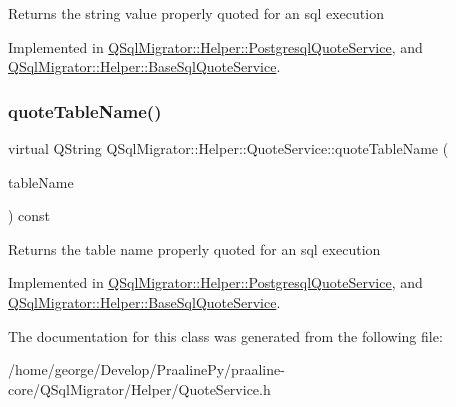 \begin{DoxyReturn}{Returns}
the string value properly quoted for an sql execution 
\end{DoxyReturn}


Implemented in \hyperlink{class_q_sql_migrator_1_1_helper_1_1_postgresql_quote_service_aea4456a2d9ae05fbc1bb653dfcb6571f}{Q\+Sql\+Migrator\+::\+Helper\+::\+Postgresql\+Quote\+Service}, and \hyperlink{class_q_sql_migrator_1_1_helper_1_1_base_sql_quote_service_a54146919b3027be887151bcc27c56dad}{Q\+Sql\+Migrator\+::\+Helper\+::\+Base\+Sql\+Quote\+Service}.

\mbox{\label{class_q_sql_migrator_1_1_helper_1_1_quote_service_acb56728a4d07a8857955e34536844ec7}} 
\subsubsection{\texorpdfstring{quote\+Table\+Name()}{quoteTableName()}}
{\footnotesize\ttfamily virtual Q\+String Q\+Sql\+Migrator\+::\+Helper\+::\+Quote\+Service\+::quote\+Table\+Name (\begin{DoxyParamCaption}\item[{const Q\+String \&}]{table\+Name }\end{DoxyParamCaption}) const\hspace{0.3cm}{\ttfamily [pure virtual]}}

\begin{DoxyReturn}{Returns}
the table name properly quoted for an sql execution 
\end{DoxyReturn}


Implemented in \hyperlink{class_q_sql_migrator_1_1_helper_1_1_postgresql_quote_service_a56541b2bbc99faae890a9a21d50e14f6}{Q\+Sql\+Migrator\+::\+Helper\+::\+Postgresql\+Quote\+Service}, and \hyperlink{class_q_sql_migrator_1_1_helper_1_1_base_sql_quote_service_aacd2ed13fd6f57bc77b4870ac5105f9e}{Q\+Sql\+Migrator\+::\+Helper\+::\+Base\+Sql\+Quote\+Service}.



The documentation for this class was generated from the following file\+:\begin{DoxyCompactItemize}
\item 
/home/george/\+Develop/\+Praaline\+Py/praaline-\/core/\+Q\+Sql\+Migrator/\+Helper/Quote\+Service.\+h\end{DoxyCompactItemize}
